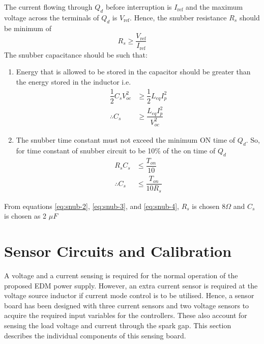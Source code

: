 	The current flowing through $Q_d$ before interruption is $I_{\text{ref}}$ and the maximum voltage across the terminals of $Q_d$ is $V_{\text{ref}}$. Hence, the snubber resistance $R_s$ should be minimum of
	\begin{equation}
		R_s \geq \dfrac{V_{\text{ref}}}{I_{\text{ref}}}
		\label{eq:snub-2}
	\end{equation}
	The snubber capacitance should be such that:
	\begin{enumerate}
		\item Energy that is allowed to be stored in the capacitor should be greater than the energy stored in the inductor i.e.
			\begin{align}
				\dfrac{1}{2}C_sV_{oc}^2 &\geq \dfrac{1}{2}L_{eq}I_p^2\\
				\therefore C_s &\geq \dfrac{L_{eq}I_p^2}{V_{oc}^2}
				\label{eq:snub-3}
			\end{align}
		\item The snubber time constant must not exceed the minimum ON time of $Q_d$. So, for time constant of snubber circuit to be 10\% of the on time of $Q_d$
			\begin{align}
				R_sC_s &\leq \dfrac{T_{on}}{10}\\
				\therefore C_s &\leq \dfrac{T_{on}}{10R_s}
				\label{eq:snub-4}
			\end{align}
	\end{enumerate}
	From equations \eqref{eq:snub-2}, \eqref{eq:snub-3}, and \eqref{eq:snub-4}, $R_s$ is chosen $8 \Omega$ and $C_s$ is chosen as 2 $\mu F$

\section{Sensor Circuits and Calibration}
	A voltage and a current sensing is required for the normal operation of the proposed EDM power supply. However, an extra current sensor is required at the voltage source inductor if current mode control is to be utilised. Hence, a sensor board has been designed with three current sensors and two voltage sensors to acquire the required input variables for the controllers. These also account for sensing the load voltage and current through the spark gap. This section describes the individual components of this sensing board. 
